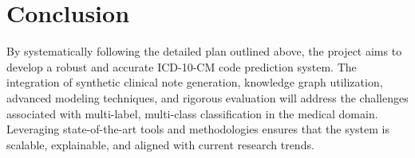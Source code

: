 \documentclass[12pt, a4paper]{article}
\begin{document}
\section{Conclusion}

By systematically following the detailed plan outlined above, the project aims to develop a robust and accurate ICD-10-CM code prediction system. The integration of synthetic clinical note generation, knowledge graph utilization, advanced modeling techniques, and rigorous evaluation will address the challenges associated with multi-label, multi-class classification in the medical domain. Leveraging state-of-the-art tools and methodologies ensures that the system is scalable, explainable, and aligned with current research trends.
\end{document}
